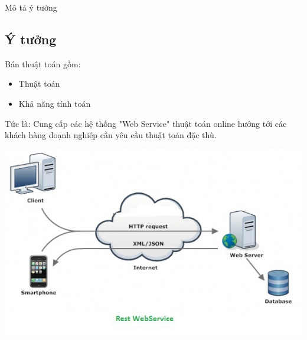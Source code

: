 \documentclass{beamer}
\begin{document}
\begin{frame}{Mô tả ý tưởng}
\subsection{Ý tưởng}
Bán thuật toán gồm:
\begin{itemize}
\item Thuật toán 
\item Khả năng tính toán 
\end{itemize}
Tức là: Cung cấp các hệ thống {\color{hilight}"Web Service"} thuật toán online hướng tới các khách hàng doạnh nghiệp cần yêu cầu thuật toán đặc thù.
\end{frame}
\begin{frame}
\includegraphics[scale=0.7]{R.jpg}
\end{frame}
\end{document}
